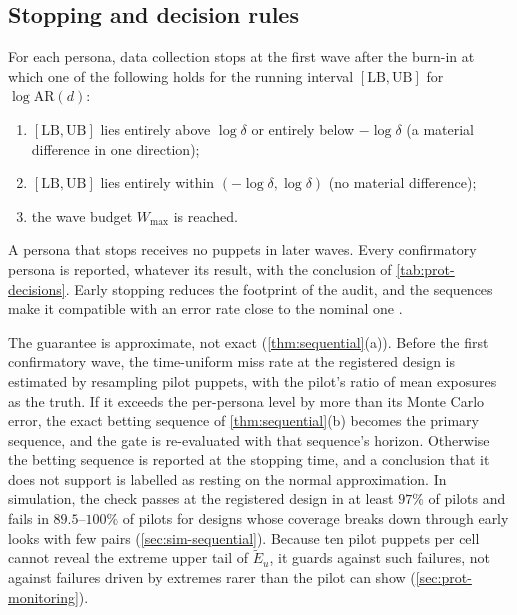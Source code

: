 \subsection{Stopping and decision rules}\label{sec:prot-stopping}

For each persona, data collection stops at the first wave after the burn-in at which one of the following holds for the running interval $[\mathrm{LB},\mathrm{UB}]$ for $\log\mathrm{AR}(d)$:
\begin{enumerate}[(S1)]
  \item $[\mathrm{LB},\mathrm{UB}]$ lies entirely above $\log\delta$ or entirely below $-\log\delta$ (a material difference in one direction);
  \item $[\mathrm{LB},\mathrm{UB}]$ lies entirely within $(-\log\delta,\log\delta)$ (no material difference);
  \item the wave budget $W_{\max}$ is reached.
\end{enumerate}
A persona that stops receives no puppets in later waves. Every confirmatory persona is reported, whatever its result, with the conclusion of \cref{tab:prot-decisions}. Early stopping reduces the footprint of the audit, and the sequences make it compatible with an error rate close to the nominal one \citep{wald1945,ramdas2023}.

The guarantee is approximate, not exact (\cref{thm:sequential}(a)).
Before the first confirmatory wave, the time-uniform miss rate at the registered design is estimated by resampling pilot puppets, with the pilot's ratio of mean exposures as the truth. If it exceeds the per-persona level by more than its Monte Carlo error, the exact betting sequence of \cref{thm:sequential}(b) becomes the primary sequence, and the gate is re-evaluated with that sequence's horizon. Otherwise the betting sequence is reported at the stopping time, and a conclusion that it does not support is labelled as resting on the normal approximation. In simulation, the check passes at the registered design in at least $97\%$ of pilots and fails in $89.5$--$100\%$ of pilots for designs whose coverage breaks down through early looks with few pairs (\cref{sec:sim-sequential}). Because ten pilot puppets per cell cannot reveal the extreme upper tail of $\widetilde E_u$, it guards against such failures, not against failures driven by extremes rarer than the pilot can show (\cref{sec:prot-monitoring}).

